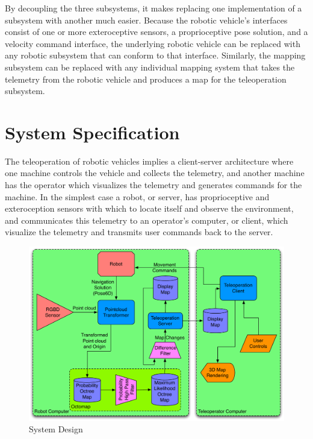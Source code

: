 \documentclass[12pt]{report}
\begin{document}
By decoupling the three subsystems, it makes replacing one implementation of a subsystem with another much easier.  Because the robotic vehicle's interfaces consist of one or more exteroceptive sensors, a proprioceptive pose solution, and a velocity command interface, the underlying robotic vehicle can be replaced with any robotic subsystem that can conform to that interface.  Similarly, the mapping subsystem can be replaced with any individual mapping system that takes the telemetry from the robotic vehicle and produces a map for the teleoperation subsystem.

\section{System Specification}  %
The teleoperation of robotic vehicles implies a client-server architecture where one machine controls the vehicle and collects the telemetry, and another machine has the operator which visualizes the telemetry and generates commands for the machine.  In the simplest case a robot, or server, has proprioceptive and exteroception sensors with which to locate itself and observe the environment, and communicates this telemetry to an operator's computer, or client, which visualize the telemetry and transmits user commands back to the server.

\begin{figure}[ht]
  \centering
  \includegraphics[width=6in,keepaspectratio]{system_diagram.pdf}
  \caption{System Design}
  \label{fig:system_diagram}
\end{figure}
\end{document}
